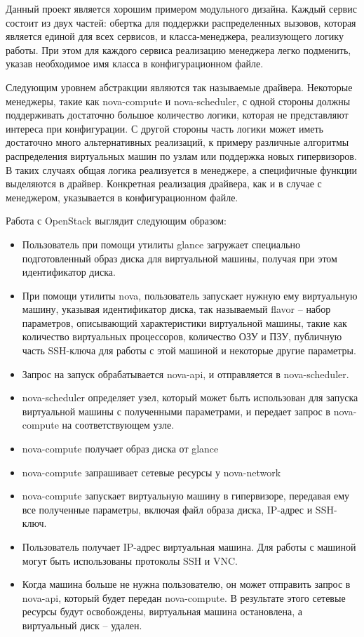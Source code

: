 Данный проект является хорошим примером модульного дизайна. 
Каждый сервис состоит из двух частей: обертка для поддержки распределенных вызовов,
которая является единой для всех сервисов, и класса-менеджера, реализующего логику работы.
При этом для каждого сервиса реализацию менеджера легко подменить, указав необходимое
имя класса в конфигурационном файле.

Следующим уровнем абстракции являются так называемые драйвера. Некоторые менеджеры,
такие как nova-compute и nova-scheduler, с одной стороны должны поддерживать достаточно 
большое количество логики, которая не представляют интереса при конфигурации.
С другой стороны часть логики может иметь достаточно много альтернативных реализаций,
к примеру различные алгоритмы распределения виртуальных машин по узлам или
поддержка новых гипервизоров. В таких случаях общая логика реализуется в менеджере,
а специфичные функции выделяются в драйвер. Конкретная реализация драйвера, как и в случае
с менеджером, указывается в конфигурационном файле.

Работа с OpenStack выглядит следующим образом:
\begin{itemize}
    \item Пользователь при помощи утилиты glance загружает специально подготовленный 
    образ диска для виртуальной машины, получая при этом идентификатор диска.
    \item При помощи утилиты nova, пользователь запускает нужную ему виртуальную машину,
    указывая идентификатор диска, так называемый flavor -- набор параметров, описывающий
    характеристики виртуальной машины, такие как количество виртуальных процессоров, 
    количество ОЗУ и ПЗУ, публичную часть SSH-ключа для работы с этой машиной и некоторые
    другие параметры.
    \item Запрос на запуск обрабатывается nova-api, и отправляется в nova-scheduler.
    \item nova-scheduler определяет узел, который может быть использован для запуска 
    виртуальной машины с полученными параметрами, и передает запрос в nova-compute
    на соответствующем узле.
    \item nova-compute получает образ диска от glance
    \item nova-compute запрашивает сетевые ресурсы у nova-network
    \item nova-compute запускает виртуальную машину в гипервизоре, передавая ему все
    полученные параметры, включая файл образа диска, IP-адрес и SSH-ключ.
    \item Пользователь получает IP-адрес виртуальная машина. 
    Для работы с машиной могут быть использованы протоколы SSH и VNC.
    \item Когда машина больше не нужна пользователю, он может отправить запрос в nova-api, 
    который будет передан nova-compute. В результате этого сетевые ресурсы будут освобождены,
    виртуальная машина остановлена, а виртуальный диск -- удален.
\end{itemize}


